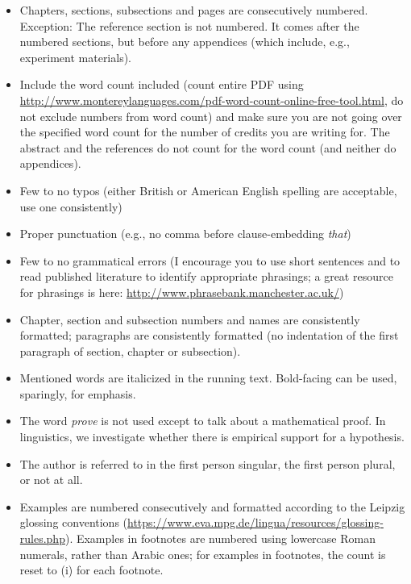 \documentclass[11pt,fleqn,a4paper/thesis]{article}
\newcommand{\6}{\mbox{$[\hspace*{-.6mm}[$}}
\newcommand{\9}{\mbox{$]\hspace*{-.6mm}]$}}
\begin{document}
\begin{itemize}[itemsep=-1pt,leftmargin=2.5ex,topsep=-2pt]
\item Chapters, sections, subsections and pages are consecutively numbered. Exception: The reference section is not numbered. It comes after the numbered sections, but before any appendices (which include, e.g., experiment materials).

\item Include the word count included (count entire PDF using \url{http://www.montereylanguages.com/pdf-word-count-online-free-tool.html}, do not exclude numbers from word count) and make sure you are not going over the specified word count for the number of credits you are writing for. The abstract and the references do not count for the word count (and neither do appendices).

\item Few to no typos (either British or American English spelling are acceptable, use one consistently)

\item Proper punctuation (e.g., no comma before clause-embedding {\em that})

\item Few to no grammatical errors (I encourage you to use short sentences and to read published literature to identify appropriate phrasings; a great resource for phrasings is here: \url{http://www.phrasebank.manchester.ac.uk/})

\item Chapter, section and subsection numbers and names are consistently formatted; paragraphs are consistently formatted (no indentation of the first paragraph of section, chapter or subsection).

\item Mentioned words are italicized in the running text. Bold-facing can be used, sparingly, for emphasis.

\item The word {\em prove} is not used except to talk about a mathematical proof. In linguistics, we investigate whether there is empirical support for a hypothesis. 

\item The author is referred to in the first person singular, the first person plural, or not at all.

\item Examples are numbered consecutively and formatted according to the Leipzig glossing conventions (\url{https://www.eva.mpg.de/lingua/resources/glossing-rules.php}). Examples in footnotes are numbered using lowercase Roman numerals, rather than Arabic ones; for examples in footnotes, the count is reset to (i) for each footnote.


\end{itemize}
\end{document}
